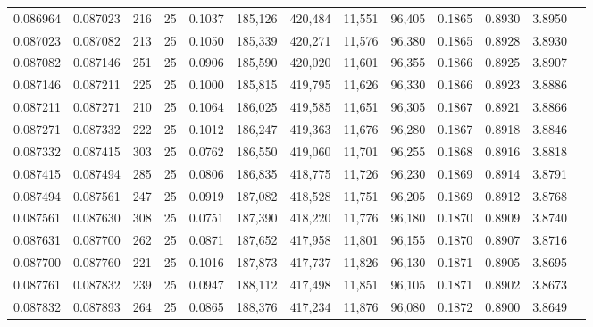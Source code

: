 \begin{tabular}{rrrrrrrrrrrrr}
0.086964 & 0.087023 &   216 &  25 &                                     0.1037 & 185,126 & 420,484 &  11,551 &  96,405 & 0.1865 & 0.8930 & 3.8950 \\
0.087023 & 0.087082 &   213 &  25 &                                     0.1050 & 185,339 & 420,271 &  11,576 &  96,380 & 0.1865 & 0.8928 & 3.8930 \\
0.087082 & 0.087146 &   251 &  25 &                                     0.0906 & 185,590 & 420,020 &  11,601 &  96,355 & 0.1866 & 0.8925 & 3.8907 \\
0.087146 & 0.087211 &   225 &  25 &                                     0.1000 & 185,815 & 419,795 &  11,626 &  96,330 & 0.1866 & 0.8923 & 3.8886 \\
0.087211 & 0.087271 &   210 &  25 &                                     0.1064 & 186,025 & 419,585 &  11,651 &  96,305 & 0.1867 & 0.8921 & 3.8866 \\
0.087271 & 0.087332 &   222 &  25 &                                     0.1012 & 186,247 & 419,363 &  11,676 &  96,280 & 0.1867 & 0.8918 & 3.8846 \\
0.087332 & 0.087415 &   303 &  25 &                                     0.0762 & 186,550 & 419,060 &  11,701 &  96,255 & 0.1868 & 0.8916 & 3.8818 \\
0.087415 & 0.087494 &   285 &  25 &                                     0.0806 & 186,835 & 418,775 &  11,726 &  96,230 & 0.1869 & 0.8914 & 3.8791 \\
0.087494 & 0.087561 &   247 &  25 &                                     0.0919 & 187,082 & 418,528 &  11,751 &  96,205 & 0.1869 & 0.8912 & 3.8768 \\
0.087561 & 0.087630 &   308 &  25 &                                     0.0751 & 187,390 & 418,220 &  11,776 &  96,180 & 0.1870 & 0.8909 & 3.8740 \\
0.087631 & 0.087700 &   262 &  25 &                                     0.0871 & 187,652 & 417,958 &  11,801 &  96,155 & 0.1870 & 0.8907 & 3.8716 \\
0.087700 & 0.087760 &   221 &  25 &                                     0.1016 & 187,873 & 417,737 &  11,826 &  96,130 & 0.1871 & 0.8905 & 3.8695 \\
0.087761 & 0.087832 &   239 &  25 &                                     0.0947 & 188,112 & 417,498 &  11,851 &  96,105 & 0.1871 & 0.8902 & 3.8673 \\
0.087832 & 0.087893 &   264 &  25 &                                     0.0865 & 188,376 & 417,234 &  11,876 &  96,080 & 0.1872 & 0.8900 & 3.8649 \\

\end{tabular}
